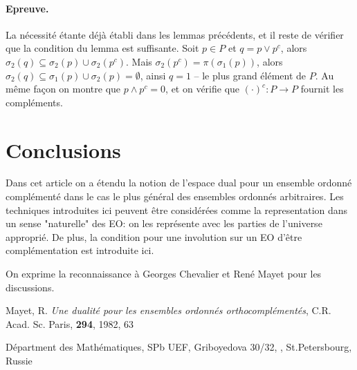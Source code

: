\paragraph{Epreuve.} La n\'ecessit\'e \'etante d\'ej\`a \'etabli 
dans les lemmas pr\'ec\'edents, et il reste de v\'erifier que la 
condition du lemma est suffisante. Soit $p\in P$ et $q=p\lor p^c$, 
alors $\sigma_2(q) \subseteq \sigma_2(p) \cup \sigma_2(p^c)$. Mais 
$\sigma_2(p^c)=\pi(\sigma_1(p))$, alors $\sigma_2(q) \subseteq 
\sigma_1(p) \cup \sigma_2(p) = \emptyset$, ainsi $q=1$ -- le plus 
grand \'el\'ement de $P$. Au m\^eme fa\c con on montre que $p\land 
p^c = 0$, et on v\'erifie que $(\cdot)^c:P\to P$ fournit les 
compl\'ements. \endproof 

\section{Conclusions} 

Dans cet article on a \'etendu la notion de l'espace dual pour un 
ensemble ordonn\'e compl\'ement\'e dans le cas le plus g\'en\'eral 
des ensembles ordonn\'es arbitraires. Les techniques introduites 
ici peuvent \^etre consid\'er\'ees comme la representation dans un 
sense "naturelle" des EO: on les repr\'esente avec les parties de 
l'universe appropri\'e. De plus, la condition pour une involution 
sur un EO d'\^etre compl\'ementation est introduite ici. 

On exprime la reconnaissance \`a Georges Chevalier et Ren\'e Mayet 
pour les discussions. 

\begin{thebibliography}{99} 
 Mayet, R. {\em Une dualit\'e pour les ensembles 
ordonn\'es orthocompl\'ement\'es\/}, C.R. Acad. Sc. Paris, {\bf 
294}, 1982, 63 
\end{thebibliography} 

\noindent D\'epartment des Math\'ematiques, SPb UEF,\newline 
\noindent Griboyedova 30/32, \newline 
{}, St.Petersbourg, Russie 
 
